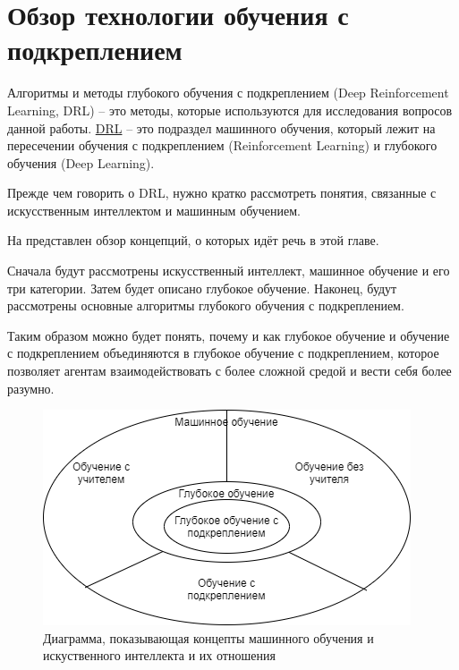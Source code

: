 \chapter{Обзор технологии обучения с подкреплением} \label{ch1}


Алгоритмы и методы глубокого обучения с подкреплением (Deep Reinforcement Learning, DRL) – это методы, которые используются для исследования вопросов данной работы. \hyperref[acr:drl]{DRL} – это подраздел машинного обучения, который лежит на пересечении обучения с подкреплением (Reinforcement Learning) и глубокого обучения (Deep Learning).

Прежде чем говорить о DRL, нужно кратко рассмотреть понятия, связанные с искусственным интеллектом и машинным обучением.

На  представлен обзор концепций, о которых идёт речь в этой главе. 

Сначала будут рассмотрены искусственный интеллект, машинное обучение и его три категории. Затем будет описано глубокое обучение. Наконец, будут рассмотрены основные алгоритмы глубокого обучения с подкреплением.

Таким образом можно будет понять, почему и как глубокое обучение и обучение с подкреплением объединяются в глубокое обучение с подкреплением, которое позволяет агентам взаимодействовать с более сложной средой и вести себя более разумно.

\begin{figure}[ht!] 
	\center
	\includegraphics [scale=0.80] {my_folder/images/ch1/ML-and-AI-concepts.png}
	\caption{Диаграмма, показывающая концепты машинного обучения и искуственного интеллекта и их отношения} 
	\label{fig:ch1-ML-and-AI-concepts}  
\end{figure}

